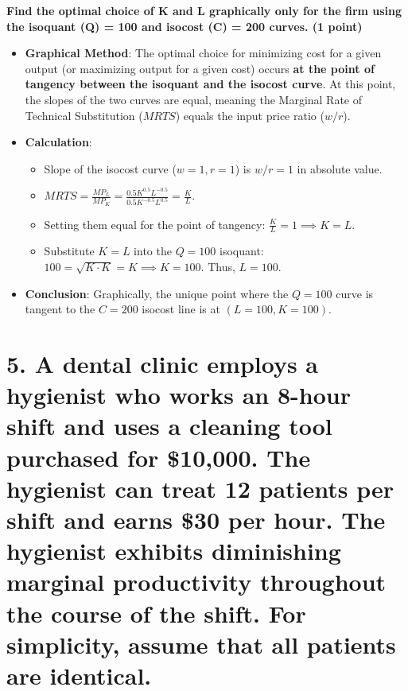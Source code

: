 \documentclass[11pt, letterpaper]{article}
\begin{document}
\textbf{Find the optimal choice of K and L graphically only for the firm using the isoquant (Q) = 100 and isocost (C) = 200 curves. (1 point)}
\begin{itemize}[leftmargin=*]
    \item \textbf{Graphical Method}: The optimal choice for minimizing cost for a given output (or maximizing output for a given cost) occurs \textbf{at the point of tangency between the isoquant and the isocost curve}. At this point, the slopes of the two curves are equal, meaning the Marginal Rate of Technical Substitution ($MRTS$) equals the input price ratio ($w/r$).
    \item \textbf{Calculation}:
        \begin{itemize}[leftmargin=1.5em]
            \item Slope of the isocost curve ($w=1, r=1$) is $w/r = 1$ in absolute value.
            \item $MRTS = \frac{MP_L}{MP_K} = \frac{0.5 K^{0.5} L^{-0.5}}{0.5 K^{-0.5} L^{0.5}} = \frac{K}{L}$.
            \item Setting them equal for the point of tangency: $\frac{K}{L} = 1 \implies K = L$.
            \item Substitute $K=L$ into the $Q=100$ isoquant: $100 = \sqrt{K \cdot K} = K \implies K=100$. Thus, $L=100$.
        \end{itemize}
    \item \textbf{Conclusion}: Graphically, the unique point where the $Q=100$ curve is tangent to the $C=200$ isocost line is at \textbf{$(L=100, K=100)$}.
\end{itemize}
\begin{center}
\end{center}

\section*{5. A dental clinic employs a hygienist who works an 8-hour shift and uses a cleaning tool purchased for \$10,000.  The hygienist can treat 12 patients per shift and earns \$30 per hour. The hygienist exhibits diminishing marginal productivity throughout the course of the shift. For simplicity, assume that all patients are identical.}
\end{document}
